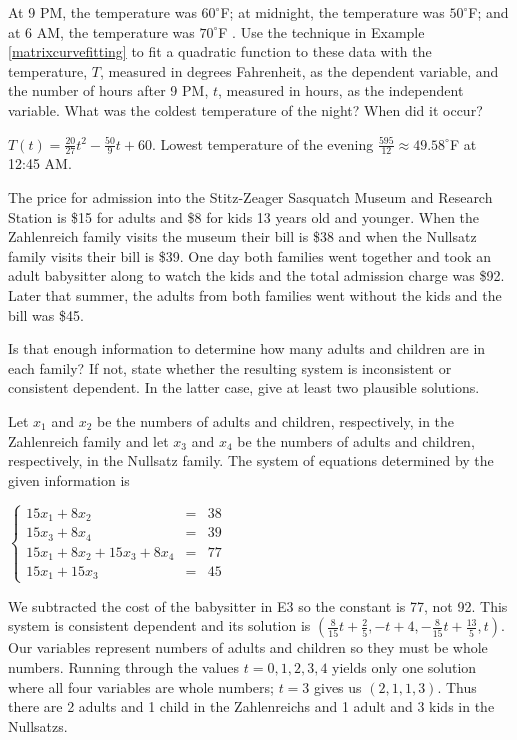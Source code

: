 \documentclass{ximera}
\begin{document}
\begin{problem}
At 9 PM, the temperature was $60^{\circ}$F; at midnight, the temperature was $50^{\circ}$F; and at 6 AM, the temperature was $70^{\circ}$F .  Use the technique in Example \ref{matrixcurvefitting} to fit a quadratic function to these data with the temperature, $T$, measured in degrees Fahrenheit, as the dependent variable, and the number of hours after 9 PM, $t$, measured in hours, as the independent variable. What was the coldest temperature of the night?  When did it occur?

\begin{solution}
$T(t) = \frac{20}{27} t^2 - \frac{50}{9} t + 60$.  Lowest temperature of the evening $\frac{595}{12} \approx 49.58^{\circ}$F at 12:45 AM.
\end{solution}
\end{problem}

\begin{problem}
The price for admission into the Stitz-Zeager Sasquatch Museum and Research Station is \$15 for adults and \$8 for kids 13 years old and younger. When the Zahlenreich family visits the museum their bill is \$38 and when the Nullsatz family visits their bill is \$39.  One day both families went together and took an adult babysitter along to watch the kids and the total admission charge was \$92.  Later that summer, the adults from both families went without the kids and the bill was \$45.  

Is that enough information to determine how many adults and children are in each family?  If not, state whether the resulting system is inconsistent or consistent dependent.  In the latter case, give at least two plausible solutions.

Let $x_1$ and $x_2$ be the numbers of adults and children, respectively, in the Zahlenreich family and let $x_3$ and $x_4$ be the numbers of adults and children, respectively, in the Nullsatz family.  The system of equations determined by the given information is 

$\left\{ \begin{array}{rcr} 15x_1 + 8x_2 & = & 38 \\ 
15x_3 + 8x_4 & = & 39  \\  
15x_1 +  8x_2 + 15x_3 + 8x_4 & = & 77 \\
15x_1 + 15x_3 & = & 45  \end{array} \right.$

We subtracted the cost of the babysitter in E3 so the constant is 77, not 92.  This system is consistent dependent and its solution is $\left(\frac{8}{15}t + \frac{2}{5}, -t + 4, -\frac{8}{15}t + \frac{13}{5}, t \right)$.  Our variables represent numbers of adults and children so they must be whole numbers.  Running through the values $t = 0, 1, 2, 3, 4$ yields only one solution where all four variables are whole numbers; $t = 3$ gives us $(2, 1, 1, 3)$.  Thus there are 2 adults and 1 child in the Zahlenreichs and 1 adult and 3 kids in the Nullsatzs.
\end{problem} 
\end{document}
